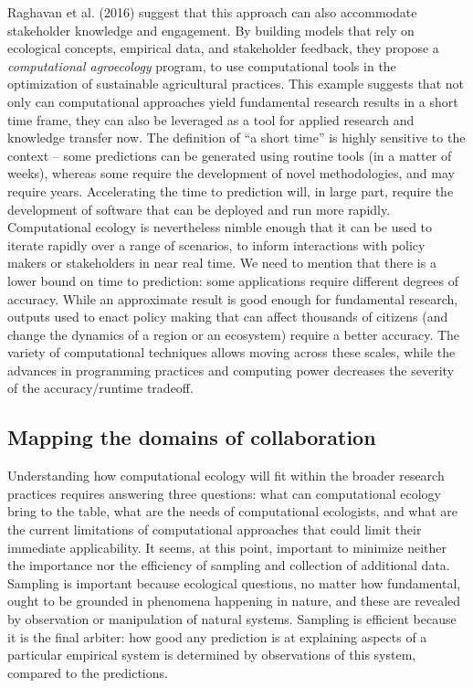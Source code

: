 \documentclass[12pt]{article}
\begin{document}
Raghavan et al. (2016) suggest that this approach can also accommodate
stakeholder knowledge and engagement. By building models that rely on
ecological concepts, empirical data, and stakeholder feedback, they
propose a \emph{computational agroecology} program, to use computational
tools in the optimization of sustainable agricultural practices. This
example suggests that not only can computational approaches yield
fundamental research results in a short time frame, they can also be
leveraged as a tool for applied research and knowledge transfer now. The
definition of \enquote{a short time} is highly sensitive to the context
-- some predictions can be generated using routine tools (in a matter of
weeks), whereas some require the development of novel methodologies, and
may require years. Accelerating the time to prediction will, in large
part, require the development of software that can be deployed and run
more rapidly. Computational ecology is nevertheless nimble enough that
it can be used to iterate rapidly over a range of scenarios, to inform
interactions with policy makers or stakeholders in near real time. We
need to mention that there is a lower bound on time to prediction: some
applications require different degrees of accuracy. While an approximate
result is good enough for fundamental research, outputs used to enact
policy making that can affect thousands of citizens (and change the
dynamics of a region or an ecosystem) require a better accuracy. The
variety of computational techniques allows moving across these scales,
while the advances in programming practices and computing power
decreases the severity of the accuracy/runtime tradeoff.

\hypertarget{mapping-the-domains-of-collaboration}{%
\subsection{Mapping the domains of
collaboration}\label{mapping-the-domains-of-collaboration}}

Understanding how computational ecology will fit within the broader
research practices requires answering three questions: what can
computational ecology bring to the table, what are the needs of
computational ecologists, and what are the current limitations of
computational approaches that could limit their immediate applicability.
It seems, at this point, important to minimize neither the importance
nor the efficiency of sampling and collection of additional data.
Sampling is important because ecological questions, no matter how
fundamental, ought to be grounded in phenomena happening in nature, and
these are revealed by observation or manipulation of natural systems.
Sampling is efficient because it is the final arbiter: how good any
prediction is at explaining aspects of a particular empirical system is
determined by observations of this system, compared to the predictions.
\end{document}
